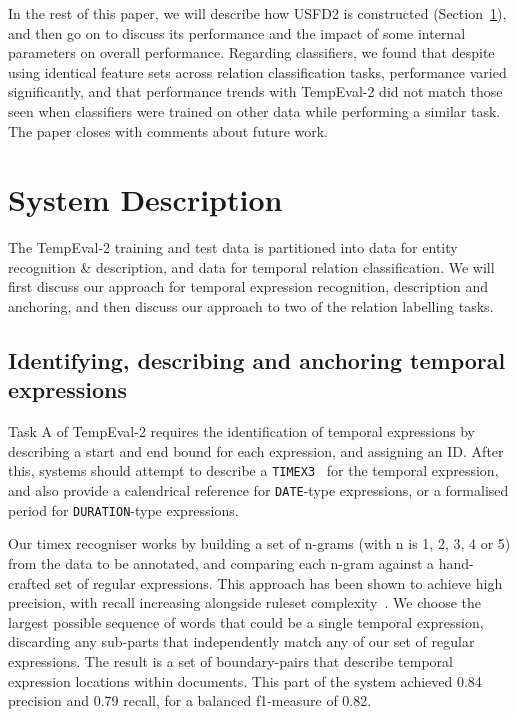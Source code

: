 \documentclass[11pt]{article}
\begin{document}
In the rest of this paper, we will describe how USFD2 is constructed (Section~\ref{description}), and then go on to discuss its performance and the impact of some internal parameters on overall performance. Regarding classifiers, we found that despite using identical feature sets across relation classification tasks, performance varied significantly, and that performance trends with TempEval-2 did not match those seen when classifiers were trained on other data while performing a similar task. The paper closes with comments about future work.


\section{System Description}
\label{description}
The TempEval-2 training and test data is partitioned into data for entity recognition \& description, and data for temporal relation classification. We will first discuss our approach for temporal expression recognition, description and anchoring, and then discuss our approach to two of the relation labelling tasks.

\subsection{Identifying, describing and anchoring temporal expressions}
\label{timex}
Task A of TempEval-2 requires the identification of temporal expressions by describing a start and end bound for each expression, and assigning an ID. After this, systems should attempt to describe a {\tt TIMEX3}~\cite{ISO08} for the temporal expression, and also provide a calendrical reference for {\tt DATE}-type expressions, or a formalised period for {\tt DURATION}-type expressions.

Our timex recogniser works by building a set of n-grams (with n is 1, 2, 3, 4 or 5) from the data to be annotated, and comparing each n-gram against a hand-crafted set of regular expressions. This approach has been shown to achieve high precision, with recall increasing alongside ruleset complexity~\cite{han2006language,mani2000robust,ahn2005towards}. We choose the largest possible sequence of words that could be a single temporal expression, discarding any sub-parts that independently match any of our set of regular expressions. The result is a set of boundary-pairs that describe temporal expression locations within documents. This part of the system achieved 0.84 precision and 0.79 recall, for a balanced f1-measure of 0.82.
\end{document}
